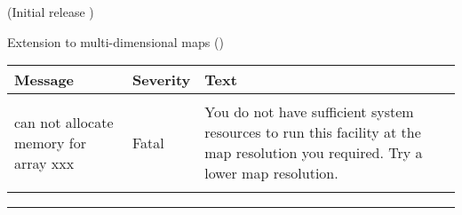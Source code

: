 \begin{release}
  \begin{relist}
    \item (Initial release )
    \item Extension to multi-dimensional maps ()
  \end{relist}
\end{release}

\begin{messages}
{
\begin{tabular}{p{0.25\hsize} p{0.1\hsize} p{0.35\hsize}} \hline  
  \textbf{Message} & \textbf{Severity} & \textbf{Text} \\ \hline
                   &                   &   \\ %
can not allocate memory for array xxx &  Fatal & You do not have
                   sufficient system resources to run this
                   facility at the map resolution you required. 
  Try a lower map resolution.  \\ 
                   &                   &   \\ \hline %
\end{tabular}
} 
\end{messages}

\rule{\hsize}{2mm}

\newpage

